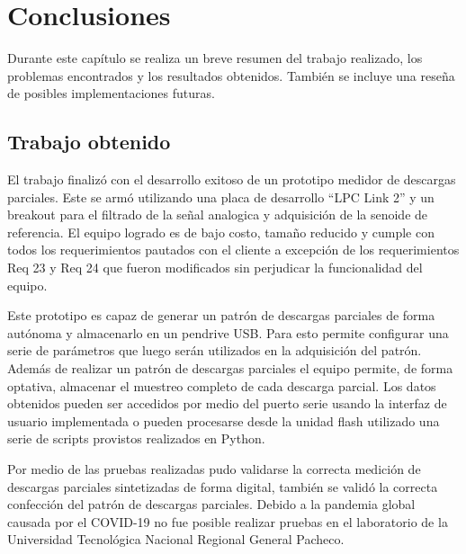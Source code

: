 
\chapter{Conclusiones} %

\label{Chapter5} %
Durante este capítulo se realiza un breve resumen del trabajo realizado, los problemas encontrados y los resultados obtenidos. También se incluye una reseña de posibles implementaciones futuras.

\section{Trabajo obtenido}

El trabajo finalizó con el desarrollo exitoso de un prototipo medidor de descargas parciales. Este se armó utilizando una placa de desarrollo “LPC Link 2” y un breakout para el filtrado de la señal analogica y adquisición de la senoide de referencia. El equipo logrado es de bajo costo, tamaño reducido y cumple con todos los requerimientos pautados con el cliente a excepción de los requerimientos Req 23 y Req 24 que fueron modificados sin perjudicar la funcionalidad del equipo.

Este prototipo es capaz de generar un patrón de descargas parciales de forma autónoma y almacenarlo en un pendrive USB. Para esto permite configurar una serie de parámetros que luego serán utilizados en la adquisición del patrón. Además de realizar un patrón de descargas parciales el equipo permite, de forma optativa, almacenar el muestreo completo de cada descarga parcial. Los datos obtenidos pueden ser accedidos por medio del puerto serie usando la interfaz de usuario implementada o pueden procesarse desde la unidad flash utilizado una serie de scripts provistos realizados en Python.

Por medio de las pruebas realizadas pudo validarse la correcta medición de descargas parciales sintetizadas de forma digital, también se validó la correcta confección del patrón de descargas parciales. Debido a la pandemia global causada por el COVID-19 no fue posible realizar pruebas en el laboratorio de la Universidad Tecnológica Nacional Regional General Pacheco.

